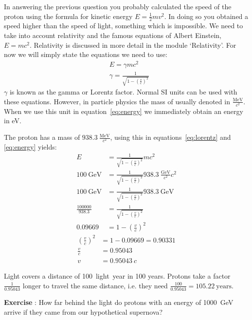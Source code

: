 In answering the previous question you probably calculated the speed of the proton using the formula for kinetic energy $E=\frac{1}{2}mv^2$. In doing so you obtained a speed higher than the speed of light, something which is impossible. We need to take into account relativity and the famous equations of Albert Einstein, $E=mc^2$. Relativity is discussed in more detail in the module `Relativity'. For now we will simply state the equations we need to use:
\begin{align}
& E=\gamma mc^2 \label{eq:energy}\\
& \gamma = \frac{1}{\sqrt{1-\left( \frac{v}{c} \right)^2 }} \label{eq:lorentz}
\end{align}
$\gamma$ is known as the gamma or Lorentz factor. Normal SI units can be used with these equations. However, in particle physics the mass of usually denoted in $\frac{\mbox{MeV}}{c^2}$. When we use this unit in equation~\ref{eq:energy} we immediately obtain an energy in eV.

The proton has a mass of $938.3~\frac{\mbox{MeV}}{c^2}$, using this in equations~\ref{eq:lorentz} and \ref{eq:energy} yields:
\begin{align}
E &= \frac{1}{\sqrt{1-\left( \frac{v}{c}\right)^2}} mc^2 \\
100~\mbox{GeV} &= \frac{1}{\sqrt{1-\left( \frac{v}{c}\right)^2}} 938.3~\frac{\mbox{GeV}}{c^2}c^2 \\
100~\mbox{GeV} &= \frac{1}{\sqrt{1-\left( \frac{v}{c}\right)^2}} 938.3~\mbox{GeV} \\
\frac{100000}{938.3} &= \frac{1}{\sqrt{1-\left( \frac{v}{c}\right)^2}} \\
0.09669 &= 1 - \left( \frac{v}{c} \right)^2 
\end{align}
\begin{align}
\left( \frac{v}{c} \right)^2 &= 1-0.09669=0.90331 \\
\frac{v}{c} &= 0.95043 \\
v &= 0.95043~c
\end{align}

Light covers a distance of 100~light~year in 100 years. Protons take a factor $\frac{1}{0.95043}$ longer to travel the same distance, i.e. they need $\frac{100}{0.95043}=105.22~\mbox{years}$.

\begin{shaded}
\textbf{Exercise \theExercise {}} : How far behind the light do protons with an energy of 1000~GeV arrive if they came from our hypothetical supernova?\end{shaded}

